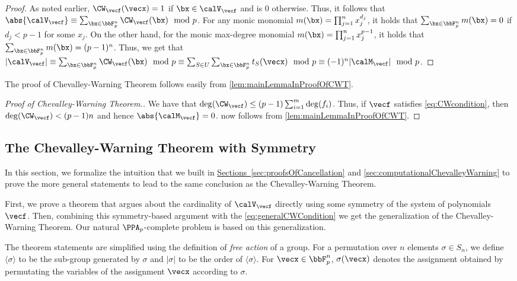 \begin{proof}
As noted earlier, $\CW_{\vecf}(\vecx) = 1$ if $\bx \in \calV_{\vecf}$ and is $0$ otherwise. Thus, it follows that $\abs{\calV_{\vecf}} \equiv \sum_{\bx \in \bbF_p^n} \CW_{\vecf}(\bx) \mod{p}$. For any monic monomial $m(\bx) = \prod_{j=1}^n x_j^{d_j}$, it holds that $\sum_{\bx \in \bbF_p^n} m(\bx) = 0$ if $d_j < p - 1$ for some $x_j$. On the other hand, for the monic max-degree monomial $m(\bx) = \prod_{j = 1}^n x_j^{p-1}$, it holds that $\sum_{\bx \in \bbF_p^n} m(\bx) = (p-1)^n$. Thus, we get that $|\calV_{\vecf}| \equiv \sum_{\bx \in \bbF_p^n} \CW_{\vecf}(\bx) \mod{p} \equiv \sum_{S\in U} \sum_{\bx \in \bbF_p^n} t_S(\vecx)  \mod{p} \equiv (-1)^n |\calM_{\vecf}| \mod{p}$.
\end{proof}

\noindent The proof of Chevalley-Warning Theorem follows easily from
\autoref{lem:mainLemmaInProofOfCWT}.

\begin{proof}[Proof of Chevalley-Warning Theorem.]
We have that $\deg(\CW_{\vecf}) \le (p - 1) \sum_{i = 1}^m \deg(f_i)$. Thus, if $\vecf$ satisfies \eqref{eq:CWcondition}, then $\deg(\CW_{\vecf}) < (p - 1) n$ and hence $\abs{\calM_{\vecf}} = 0$. \CWT now follows from \autoref{lem:mainLemmaInProofOfCWT}.
\end{proof}

\subsection{The Chevalley-Warning Theorem with Symmetry}
\label{sec:ChevalleyWarningWithSymmetry}

  In this section, we formalize the intuition that we built in
\hyperref[sec:proofsOfCancellation]{Sections~\ref{sec:proofsOfCancellation}} and \ref{sec:computationalChevalleyWarning} to prove the more general
statements to lead to the same conclusion as the Chevalley-Warning
Theorem.

  First, we prove a theorem that argues about the cardinality of $\calV_{\vecf}$
directly using some symmetry of the system of polynomials $\vecf$. Then,
combining this symmetry-based argument with the \eqref{eq:generalCWCondition} we get
the generalization of the Chevalley-Warning Theorem. Our natural
$\PPA_p$-complete problem is based on this generalization.

The theorem statements are simplified using the definition of
\textit{free action} of a group. For a permutation over $n$ elements $\sigma \in S_n$, we define
$\langle \sigma \rangle$ to be the sub-group generated by $\sigma$ and
$|\sigma|$ to be the order of $\langle\sigma \rangle$. For $\vecx \in \bbF_p^n$, $\sigma(\vecx)$ denotes the assignment obtained by permutating the variables of the assignment $\vecx$ according to $\sigma$.

